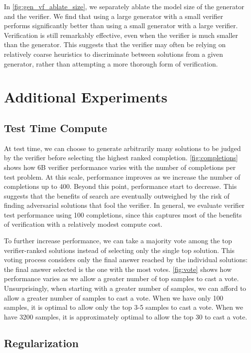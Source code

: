 In \ref{fig:gen_vf_ablate_size}, we separately ablate the model size of the generator and the verifier. We find that using a large generator with a small verifier performs significantly better than using a small generator with a large verifier. Verification is still remarkably effective, even when the verifier is much smaller than the generator. This suggests that the verifier may often be relying on relatively coarse heuristics to discriminate between solutions from a given generator, rather than attempting a more thorough form of verification.

\section{Additional Experiments}

\subsection{Test Time Compute}

At test time, we can choose to generate arbitrarily many solutions to be judged by the verifier before selecting the highest ranked completion. \ref{fig:completions} shows how 6B verifier performance varies with the number of completions per test problem. At this scale, performance improves as we increase the number of completions up to 400. Beyond this point, performance start to decrease. This suggests that the benefits of search are eventually outweighed by the risk of finding adversarial solutions that fool the verifier. In general, we evaluate verifier test performance using 100 completions, since this captures most of the benefits of verification with a relatively modest compute cost.

To further increase performance, we can take a majority vote among the top verifier-ranked solutions instead of selecting only the single top solution. This voting process considers only the final answer reached by the individual solutions: the final answer selected is the one with the most votes. \ref{fig:vote} shows how performance varies as we allow a greater number of top samples to cast a vote. Unsurprisingly, when starting with a greater number of samples, we can afford to allow a greater number of samples to cast a vote. When we have only 100 samples, it is optimal to allow only the top 3-5 samples to cast a vote. When we have 3200 samples, it is approximately optimal to allow the top 30 to cast a vote.

\subsection{Regularization}

